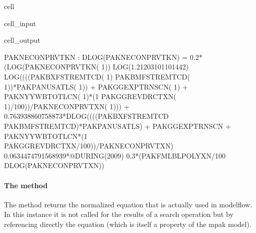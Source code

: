 \documentclass[letterpaper,10pt,english]{jupyterBook}
\begin{document}
\begin{sphinxuseclass}{cell}\begin{sphinxVerbatimInput}

\begin{sphinxuseclass}{cell_input}
\begin{sphinxVerbatim}[commandchars=\\\{\}]
\PYG{p}{[}\PYG{p}{]}
\end{sphinxVerbatim}

\end{sphinxuseclass}\end{sphinxVerbatimInput}
\begin{sphinxVerbatimOutput}

\begin{sphinxuseclass}{cell_output}
\begin{sphinxVerbatim}[commandchars=\\\{\}]
PAKNECONPRVTKN : DLOG(PAKNECONPRVTKN) =\PYGZhy{} 0.2*(LOG(PAKNECONPRVTKN( \PYGZhy{} 1)) \PYGZhy{} LOG(1.21203101101442) \PYGZhy{} LOG((((PAKBXFSTREMTCD( \PYGZhy{} 1) \PYGZhy{} PAKBMFSTREMTCD( \PYGZhy{} 1))*PAKPANUSATLS( \PYGZhy{} 1)) + PAKGGEXPTRNSCN( \PYGZhy{} 1) + PAKNYYWBTOTLCN( \PYGZhy{} 1)*(1 \PYGZhy{} PAKGGREVDRCTXN( \PYGZhy{} 1)/100))/PAKNECONPRVTXN( \PYGZhy{} 1))) + 0.763938860758873*DLOG((((PAKBXFSTREMTCD \PYGZhy{} PAKBMFSTREMTCD)*PAKPANUSATLS) + PAKGGEXPTRNSCN + PAKNYYWBTOTLCN*(1 \PYGZhy{} PAKGGREVDRCTXN/100))/PAKNECONPRVTXN) \PYGZhy{} 0.0634474791568939*@DURING(\PYGZdq{}2009\PYGZdq{}) \PYGZhy{} 0.3*(PAKFMLBLPOLYXN/100 \PYGZhy{} DLOG(PAKNECONPRVTXN))
\end{sphinxVerbatim}

\end{sphinxuseclass}\end{sphinxVerbatimOutput}

\end{sphinxuseclass}

\paragraph{The  method}
\label{\detokenize{content/05_WBModels/LoadingWBModel:the-frml-method}}
\sphinxAtStartPar
The  method returns the normalized equation that is actually used in modelflow.  In this instance it is not called for the results of a search operation but by referencing directly the equation (which is itself a property of the mpak model).
\end{document}
